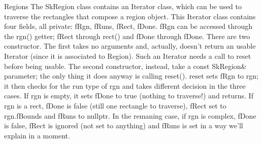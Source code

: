 Regions
The SkRegion class contains an Iterator class, which can be used to traverse the rectangles that compose a region object.
This Iterator class contains four fields, all private: fRgn, fRuns, fRect, fDone. fRgn can be accessed through the rgn() getter; fRect through rect() and fDone  through fDone.
There are two constructor. The first takes no arguments and, actually, doesn't return an usable Iterator (since it is associated to Region). Such an Iterator needs a call to reset before being usable. The second constructor, instead, take a const SkRegion& parameter; the only thing it does anyway is calling reset().
reset sets fRgn to rgn; it then checks for the run type of rgn and takes different decision in the three cases.
If rgn is empty, it sets fDone to true (nothing to traverse!) and returns.
If rgn is a rect, fDone is false (still one rectangle to traverse), fRect set to rgn.fBounds and fRuns to nullptr.
In the remaning case, if rgn is complex, fDone is false, fRect is ignored (not set to anything) and fRuns is set in a way we'll explain in a moment.
